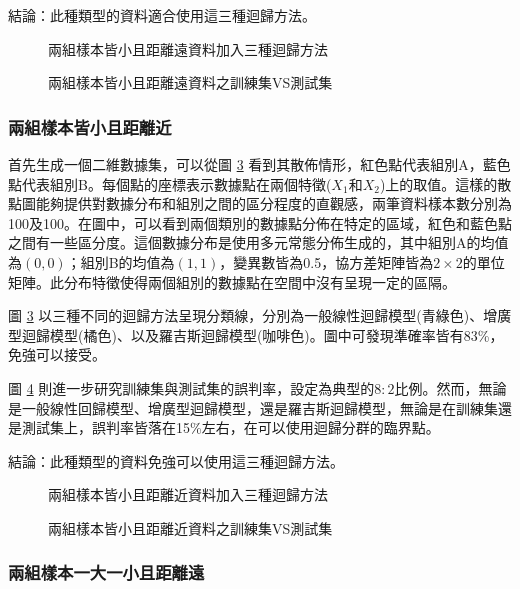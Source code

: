 \documentclass[12pt, a4paper]{article}
\begin{document}
結論：此種類型的資料適合使用這三種迴歸方法。
\begin{figure}[H]
    \caption{兩組樣本皆小且距離遠資料加入三種迴歸方法}
    \label{fig:rdn7-LARline}
\end{figure}
\begin{figure}[H]
    \caption{兩組樣本皆小且距離遠資料之訓練集VS測試集}
    \label{fig:rdn7-LARline2}
\end{figure}
\subsubsection{兩組樣本皆小且距離近}

首先生成一個二維數據集，可以從圖 \ref{fig:rdn8-LARline} 看到其散佈情形，紅色點代表組別A，藍色點代表組別B。每個點的座標表示數據點在兩個特徵($X_1$和$X_2$)上的取值。這樣的散點圖能夠提供對數據分布和組別之間的區分程度的直觀感，兩筆資料樣本數分別為100及100。在圖中，可以看到兩個類別的數據點分佈在特定的區域，紅色和藍色點之間有一些區分度。這個數據分布是使用多元常態分佈生成的，其中組別A的均值為$(0, 0)$；組別B的均值為$(1, 1)$，變異數皆為0.5，協方差矩陣皆為$2 \times 2$的單位矩陣。此分布特徵使得兩個組別的數據點在空間中沒有呈現一定的區隔。

圖 \ref{fig:rdn8-LARline} 以三種不同的迴歸方法呈現分類線，分別為一般線性迴歸模型(青綠色)、增廣型迴歸模型(橘色)、以及羅吉斯迴歸模型(咖啡色)。圖中可發現準確率皆有83\%，免強可以接受。

圖 \ref{fig:rdn8-LARline2} 則進一步研究訓練集與測試集的誤判率，設定為典型的$8:2$比例。然而，無論是一般線性回歸模型、增廣型迴歸模型，還是羅吉斯迴歸模型，無論是在訓練集還是測試集上，誤判率皆落在15\%左右，在可以使用迴歸分群的臨界點。

結論：此種類型的資料免強可以使用這三種迴歸方法。
\begin{figure}[H]
    \caption{兩組樣本皆小且距離近資料加入三種迴歸方法}
    \label{fig:rdn8-LARline}
\end{figure}
\begin{figure}[H]
    \caption{兩組樣本皆小且距離近資料之訓練集VS測試集}
    \label{fig:rdn8-LARline2}
\end{figure}
\subsubsection{兩組樣本一大一小且距離遠}
\end{document}
